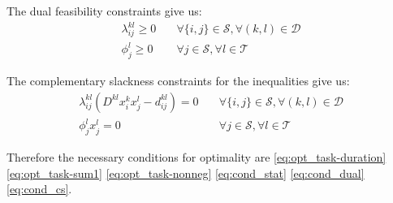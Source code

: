 The dual feasibility constraints give us:
\begin{subequations}\label{eq:cond_dual}
	\begin{align}
		\lambda_{ij}^{kl} \geq 0 & \quad \forall\{i,j\}\in\mathcal{S}, \forall(k,l)\in\mathcal{D} \label{eq:cond_dual_lambda} \\
		\phi_j^l \geq 0 & \quad \forall j\in\mathcal{S},\forall l\in\mathcal{T} \label{eq:cond_dual_phi}
	\end{align}
\end{subequations}

The complementary slackness constraints for the inequalities give us:
\begin{subequations}\label{eq:cond_cs}
	\begin{align}
		\lambda_{ij}^{kl}\left(D^{kl}x_i^kx_j^l - d_{ij}^{kl}\right) = 0 & \quad \forall\{i,j\}\in\mathcal{S}, \forall(k,l)\in\mathcal{D} \label{eq:cond_cs_duration} \\
		\phi_j^lx_j^l = 0 & \quad \forall j\in\mathcal{S},\forall l\in\mathcal{T} \label{eq:cond_cs_nonneg}
	\end{align}
\end{subequations}

Therefore the necessary conditions for optimality are \eqref{eq:opt_task-duration} \eqref{eq:opt_task-sum1} \eqref{eq:opt_task-nonneg} \eqref{eq:cond_stat} \eqref{eq:cond_dual} \eqref{eq:cond_cs}.

